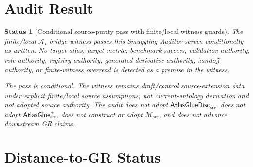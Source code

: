 \documentclass[11pt]{article}
\newcommand{\Msrc}{\mathcal{M}_{\mathrm{src}}}
\newcommand{\AtlasGlue}{\mathsf{AtlasGlue}_{\mathrm{src}}^{+}}
\newcommand{\AtlasGlueDisc}{\mathsf{AtlasGlueDisc}_{\mathrm{src}}^{+}}
\newcommand{\Astar}{\mathcal A_{\star}}
\newtheorem{status}{Status}
\begin{document}
\section{Audit Result}

\begin{status}[Conditional source-purity pass with finite/local witness guards]
The finite/local \(\Astar\) bridge witness passes this Smuggling Auditor
screen conditionally as written. No target atlas, target metric, benchmark
success, validation authority, role authority, registry authority, generated
derivative authority, handoff authority, or finite-witness overread is
detected as a premise in the witness.

The pass is conditional. The witness remains draft/control source-extension
data under explicit finite/local source assumptions, not current-ontology
derivation and not adopted source authority. The audit does not adopt
\(\AtlasGlueDisc\), does not adopt \(\AtlasGlue\), does not construct or adopt
\(\Msrc\), and does not advance downstream GR claims.
\end{status}

\section{Distance-to-GR Status}
\end{document}
